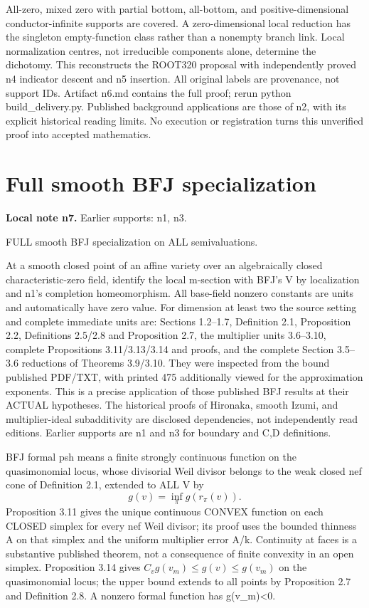 \documentclass[11pt]{article}
\begin{document}
All-zero, mixed zero with partial bottom, all-bottom, and positive-dimensional conductor-infinite supports are covered. A zero-dimensional local reduction has the singleton empty-function class rather than a nonempty branch link. Local normalization centres, not irreducible components alone, determine the dichotomy. This reconstructs the ROOT320 proposal with independently proved n4 indicator descent and n5 insertion. All original labels are provenance, not support IDs. Artifact n6.md contains the full proof; rerun python build\_delivery.py. Published background applications are those of n2, with its explicit historical reading limits. No execution or registration turns this unverified proof into accepted mathematics.


\section{Full smooth BFJ specialization}
\label{sec:n7}
\noindent\textbf{Local note n7.} Earlier supports: n1, n3.

FULL smooth BFJ specialization on ALL semivaluations.

At a smooth closed point of an affine variety over an algebraically closed characteristic-zero field, identify the local m-section with BFJ's V by localization and n1's completion homeomorphism. All base-field nonzero constants are units and automatically have zero value. For dimension at least two the source setting and complete immediate units are: Sections 1.2--1.7, Definition 2.1, Proposition 2.2, Definitions 2.5/2.8 and Proposition 2.7, the multiplier units 3.6--3.10, complete Propositions 3.11/3.13/3.14 and proofs, and the complete Section 3.5--3.6 reductions of Theorems 3.9/3.10. They were inspected from the bound published PDF/TXT, with printed 475 additionally viewed for the approximation exponents. This is a precise application of those published BFJ results at their ACTUAL hypotheses. The historical proofs of Hironaka, smooth Izumi, and multiplier-ideal subadditivity are disclosed dependencies, not independently read editions. Earlier supports are n1 and n3 for boundary and C,D definitions.

BFJ formal psh means a finite strongly continuous function on the quasimonomial locus, whose divisorial Weil divisor belongs to the weak closed nef cone of Definition 2.1, extended to ALL V by
\[
 g(v)=\inf_\pi g(r_\pi(v)).
\]
Proposition 3.11 gives the unique continuous CONVEX function on each CLOSED simplex for every nef Weil divisor; its proof uses the bounded thinness A on that simplex and the uniform multiplier error A/k. Continuity at faces is a substantive published theorem, not a consequence of finite convexity in an open simplex. Proposition 3.14 gives \(C_v g(v_m)\le g(v)\le g(v_m)\) on the quasimonomial locus; the upper bound extends to all points by Proposition 2.7 and Definition 2.8. A nonzero formal function has g(v\_m)<0.
\end{document}
